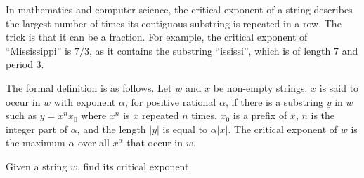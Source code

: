 In mathematics and computer science, the critical exponent of a string describes the largest number of times its contiguous substring is repeated in a row. The trick is that it can be a fraction. For example, the critical exponent of ``Mississippi'' is $7/3$, as it contains the substring ``ississi'', which is of length 7 and period 3.

The formal definition is as follows. Let $w$ and $x$ be non-empty strings. $x$ is said to occur in $w$ with exponent $\alpha$, for positive rational $\alpha$, if there is a substring $y$ in $w$ such as $y = x^nx_0$ where $x^n$ is $x$ repeated $n$ times, $x_0$ is a prefix of $x$, $n$ is the integer part of $\alpha$, and the length $|y|$ is equal to $\alpha |x|$. The critical exponent of $w$ is the maximum $\alpha$ over all $x^\alpha$ that occur in $w$.

Given a string $w$, find its critical exponent.